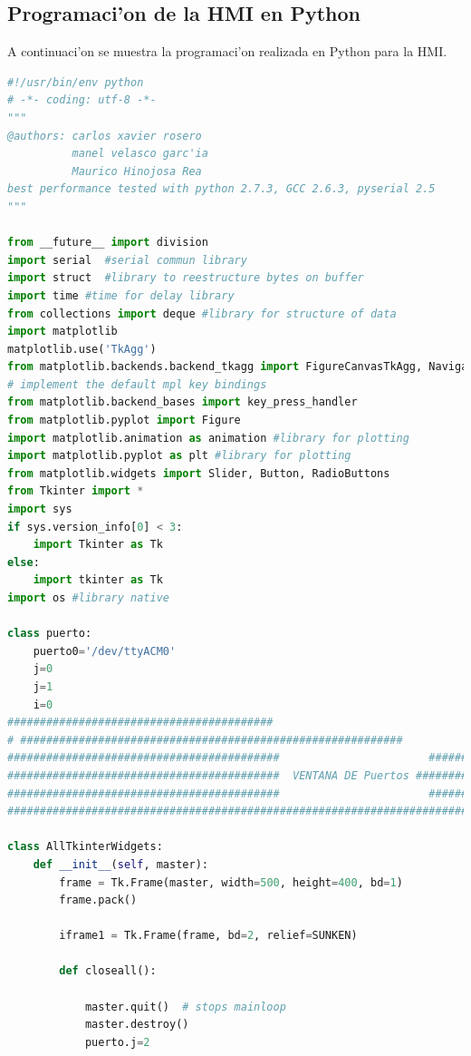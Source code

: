 \subsection{Programaci'on de la HMI en Python}
A continuaci'on se muestra la programaci'on realizada en Python para la HMI.
\\
 {\tiny
\begin{lstlisting}[language=python]
#!/usr/bin/env python
# -*- coding: utf-8 -*-
"""
@authors: carlos xavier rosero
          manel velasco garc'ia
          Maurico Hinojosa Rea
best performance tested with python 2.7.3, GCC 2.6.3, pyserial 2.5
"""

from __future__ import division
import serial  #serial commun library
import struct  #library to reestructure bytes on buffer
import time #time for delay library
from collections import deque #library for structure of data
import matplotlib
matplotlib.use('TkAgg')
from matplotlib.backends.backend_tkagg import FigureCanvasTkAgg, NavigationToolbar2TkAgg
# implement the default mpl key bindings
from matplotlib.backend_bases import key_press_handler
from matplotlib.pyplot import Figure
import matplotlib.animation as animation #library for plotting
import matplotlib.pyplot as plt #library for plotting
from matplotlib.widgets import Slider, Button, RadioButtons
from Tkinter import *
import sys
if sys.version_info[0] < 3:
    import Tkinter as Tk
else:
    import tkinter as Tk
import os #library native

class puerto:
    puerto0='/dev/ttyACM0'
    j=0
    j=1
    i=0
#########################################
# ###########################################################
##########################################                       ###################################
##########################################  VENTANA DE Puertos ###################################
##########################################                       ###################################
####################################################################################################

class AllTkinterWidgets:
    def __init__(self, master):
        frame = Tk.Frame(master, width=500, height=400, bd=1)
        frame.pack()

        iframe1 = Tk.Frame(frame, bd=2, relief=SUNKEN)

        def closeall():

            master.quit()  # stops mainloop
            master.destroy()
            puerto.j=2


\end{lstlisting}}
